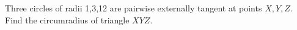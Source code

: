 Three circles of radii 1,3,12 are pairwise externally tangent at points $X,Y,Z$. Find the circumradius of triangle $XYZ$.

